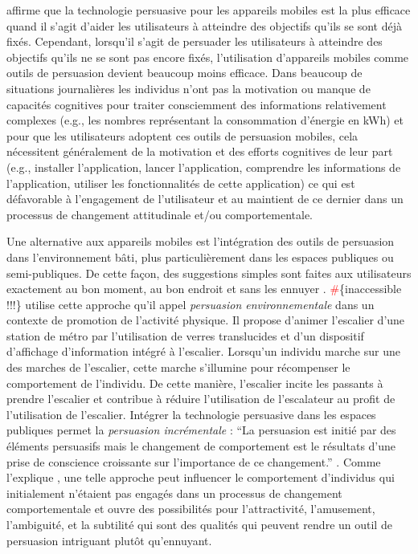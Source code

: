 \documentclass[10pt,a5paper,twoside]{article}
\begin{document}
\citet{fogg2003persuasive} affirme que la technologie persuasive pour
les appareils mobiles est la plus efficace quand il s'agit d'aider les
utilisateurs à atteindre des objectifs qu'ils se sont déjà fixés.
Cependant, lorsqu'il s'agit de persuader les utilisateurs à atteindre
des objectifs qu'ils ne se sont pas encore fixés, l'utilisation
d'appareils mobiles comme outils de persuasion
\citep{fogg1998persuasive}\citep{fogg2003persuasive} devient beaucoup
moins efficace. Dans beaucoup de situations journalières les individus
n'ont pas la motivation ou manque de capacités cognitives pour traiter
consciemment des informations relativement complexes (e.g., les nombres
représentant la consommation d'énergie en kWh)
\citep{wyer1997automaticity} et pour que les utilisateurs adoptent ces
outils de persuasion mobiles, cela nécessitent généralement de la
motivation et des efforts cognitives de leur part (e.g., installer
l'application, lancer l'application, comprendre les informations de
l'application, utiliser les fonctionnalités de cette application) ce qui
est défavorable à l'engagement de l'utilisateur et au maintient de ce
dernier dans un processus de changement attitudinale et/ou
comportementale.

Une alternative aux appareils mobiles est l'intégration des outils de
persuasion dans l'environnement bâti, plus particulièrement dans les
espaces publiques ou semi-publiques. De cette façon, des suggestions
simples sont faites aux utilisateurs exactement au bon moment, au bon
endroit et sans les ennuyer \citep{intille2004ubiquitous}.
\textcolor{red}\#\{inaccessible !!!\} \citet{mathew2005using} utilise
cette approche qu'il appel \emph{persuasion environnementale} dans un
contexte de promotion de l'activité physique. Il propose d'animer
l'escalier d'une station de métro par l'utilisation de verres
translucides et d'un dispositif d'affichage d'information intégré à
l'escalier. Lorsqu'un individu marche sur une des marches de l'escalier,
cette marche s'illumine pour récompenser le comportement de l'individu.
De cette manière, l'escalier incite les passants à prendre l'escalier et
contribue à réduire l'utilisation de l'escalateur au profit de
l'utilisation de l'escalier. Intégrer la technologie persuasive dans les
espaces publiques permet la \emph{persuasion incrémentale} : ``La
persuasion est initié par des éléments persuasifs mais le changement de
comportement est le résultats d'une prise de conscience croissante sur
l'importance de ce changement.'' \citep{mathew2005using}. Comme
l'explique \citet{davis2008towards}, une telle approche peut influencer
le comportement d'individus qui initialement n'étaient pas engagés dans
un processus de changement comportementale et ouvre des possibilités
pour l'attractivité, l'amusement, l'ambiguité, et la subtilité qui sont
des qualités qui peuvent rendre un outil de persuasion intriguant plutôt
qu'ennuyant.
\end{document}
